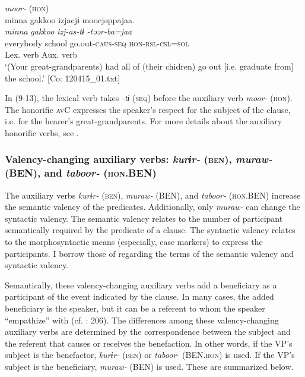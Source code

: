 \ea   \textit{moor-} (\textsc{hon}) \label{ex:9.13}\\
 \gllll  minna  {\textbar}gakkoo{\textbar}  izjacjɨ  moocjəppajaa.\\
    \textit{minna}  \textit{gakkoo}  \textit{izj-as-tɨ}  \textit{-təər-ba=jaa}\\
    everybody  school  go.out-\textsc{caus}-\textsc{seq}  \textsc{hon}-\textsc{rsl}-\textsc{csl}=\textsc{sol}\\
        Lex. verb  Aux. verb\\
    \glt     ‘(Your great-grandparents) had all of (their chidren) go out [i.e. graduate from] the school.’ [Co: 120415\_01.txt]
\z

In (9-13), the lexical verb takes \textit{{}-tɨ} (\textsc{seq}) before the auxiliary verb \textit{moor-} (\textsc{hon}). The honorific \textsc{av}C expresses the speaker’s respect for the subject of the clause, i.e. for the hearer’s great-grandparents. For more details about the auxiliary honorific verbs, see .

\subsubsection{Valency-changing auxiliary verbs: \textit{kurɨr-} (\textsc{ben}), \textit{muraw-} (BEN), and \textit{taboor-} (\textsc{hon}.BEN)}\label{sec:9.1.1.3}

The auxiliary verbs \textit{kurɨr-} (\textsc{ben}), \textit{muraw-} (BEN), and \textit{taboor-} (\textsc{hon}.BEN) increase the semantic valency of the predicates. Additionally, only \textit{muraw-} can change the syntactic valency. The semantic valency relates to the number of participant semantically required by the predicate of a clause. The syntactic valency relates to the morphosyntactic means (especially, case markers) to express the participants. I borrow those of \citet[169-173]{Payne1997} regarding the terms of the semantic valency and syntactic valency.

Semantically, these valency-changing auxiliary verbs add a beneficiary as a participant of the event indicated by the clause. In many cases, the added beneficiary is the speaker, but it can be a referent to whom the speaker “empathize” with (cf. \citealt{Kuno1987}: 206). The differences among these valency-changing auxiliary verbs are determined by the correspondence between the subject and the referent that causes or receives the benefaction. In other words, if the VP’s subject is the benefactor, \textit{kurɨr-} (\textsc{ben}) or \textit{taboor-} (BEN.\textsc{hon}) is used. If the VP’s subject is the beneficiary, \textit{muraw-} (BEN) is used. These are summarized below.

